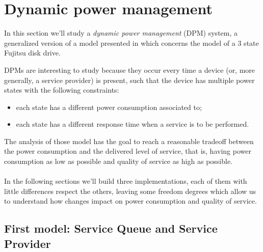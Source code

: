 \section{Dynamic power management}

In this section we'll study a \emph{dynamic power management} (DPM)
system, a generalized version of a model presented in \cite{QWP99}
which concerns the model of a 3 state Fujitsu disk drive.

DPMs are interesting to study because they occur every time a device
(or, more generally, a service provider) is present, such that the
device has multiple power states with the following constraints:
\begin{itemize}
\item each state has a different power consumption associated to;
\item each state has a different response time when a service is to be
  performed.
\end{itemize}
The analysis of those model has the goal to reach a reasonable
tradeoff between the power consumption and the delivered level of
service, that is, having power consumption as low as possible and
quality of service as high as possible.
\\\\
In the following sections we'll build three implementations, each of
them with little differences respect the others, leaving some freedom
degrees which allow us to understand how changes impact on power
consumption and quality of service.

\subsection{First model: Service Queue and Service Provider}

